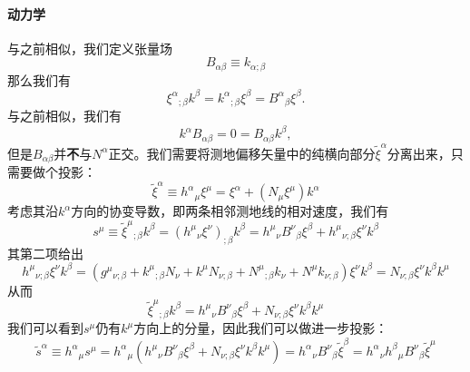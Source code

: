 \documentclass[hyperref, UTF8, a4paper]{ctexart}
\begin{document}
\paragraph{动力学}

与之前相似，我们定义张量场
\begin{equation*}
	B_{\alpha \beta } \equiv k_{\alpha ;\beta }
\end{equation*}
那么我们有
\begin{equation*}
	\xi ^{\alpha }{}_{;\beta } k^{\beta } =k^{\alpha }{}_{;\beta } \xi ^{\beta } =B^{\alpha }{}_{\beta } \xi ^{\beta } .
\end{equation*}
与之前相似，我们有
\begin{equation*}
	k^{\alpha } B_{\alpha \beta } =0=B_{\alpha \beta } k^{\beta } ,
\end{equation*}
但是$B_{\alpha \beta }$并\textbf{不}与$N^{\alpha }$正交。我们需要将测地偏移矢量中的纯横向部分$\tilde{\xi }^{\alpha }$分离出来，只需要做个投影：
\begin{equation*}
	\tilde{\xi }^{\alpha } \equiv h^{\alpha }{}_{\mu } \xi ^{\mu } =\xi ^{\alpha } +(N_{\mu } \xi ^{\mu } )k^{\alpha }
\end{equation*}
考虑其沿$k^{\alpha }$方向的协变导数，即两条相邻测地线的相对速度，我们有
\begin{equation*}
	s^{\mu } \equiv \tilde{\xi }^{\mu }{}_{;\beta } k^{\beta } =(h^{\mu }{}_{\nu } \xi ^{\nu } )_{;\beta } k^{\beta } =h^{\mu }{}_{\nu } B^{\nu }{}_{\beta } \xi ^{\beta } +h^{\mu }{}_{\nu ;\beta } \xi ^{\nu } k^{\beta }
\end{equation*}
其第二项给出
\begin{equation*}
	h^{\mu }{}_{\nu ;\beta } \xi ^{\nu } k^{\beta } =(g^{\mu }{}_{\nu ;\beta } +k^{\mu }{}_{;\beta } N_{\nu } +k^{\mu } N_{\nu ;\beta } +N^{\mu }{}_{;\beta } k_{\nu } +N^{\mu } k_{\nu ;\beta } )\xi ^{\nu } k^{\beta } =N_{\nu ;\beta } \xi ^{\nu } k^{\beta } k^{\mu }
\end{equation*}
从而
\begin{equation*}
	\tilde{\xi }^{\mu }{}_{;\beta } k^{\beta } =h^{\mu }{}_{\nu } B^{\nu }{}_{\beta } \xi ^{\beta } +N_{\nu ;\beta } \xi ^{\nu } k^{\beta } k^{\mu }
\end{equation*}
我们可以看到$s^{\mu }$仍有$k^{\mu }$方向上的分量，因此我们可以做进一步投影：
\begin{equation*}
	\tilde{s}^{\alpha } \equiv h^{\alpha }{}_{\mu } s^{\mu } =h^{\alpha }{}_{\mu } (h^{\mu }{}_{\nu } B^{\nu }{}_{\beta } \xi ^{\beta } +N_{\nu ;\beta } \xi ^{\nu } k^{\beta } k^{\mu } )=h^{\alpha }{}_{\nu } B^{\nu }{}_{\beta }\tilde{\xi }^{\beta } =h^{\alpha }{}_{\nu } h^{\beta }{}_{\mu } B^{\nu }{}_{\beta }\tilde{\xi }^{\mu }
\end{equation*}
\end{document}
